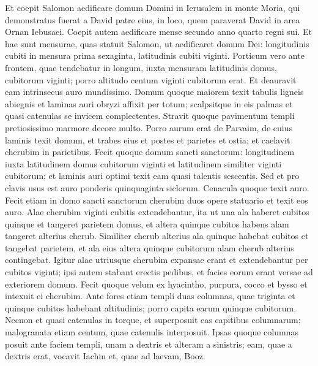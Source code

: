\begin{biblechapter}
\begin{biblechapter}
\begin{biblechapter}
\verse Et coepit Salomon aedificare domum Domini in Ierusalem in monte Moria, qui demonstratus fuerat a David patre eius, in loco, quem paraverat David in area Ornan Iebusaei. 
\verse Coepit autem aedificare mense secundo anno quarto regni sui.
 \verse Et hae sunt mensurae, quas statuit Salomon, ut aedificaret domum Dei: longitudinis cubiti in mensura prima sexaginta, latitudinis cubiti viginti. 
 \verse Porticum vero ante frontem, quae tendebatur in longum, iuxta mensuram latitudinis domus, cubitorum viginti; porro altitudo centum viginti cubitorum erat. Et deauravit eam intrinsecus auro mundissimo. 
\verse Domum quoque maiorem texit tabulis ligneis abiegnis et laminas auri obryzi affixit per totum; scalpsitque in eis palmas et quasi catenulas se invicem complectentes. 
\verse Stravit quoque pavimentum templi pretiosissimo marmore decore multo. 
\verse Porro aurum erat de Parvaim, de cuius laminis texit domum, et trabes eius et postes et parietes et ostia; et caelavit cherubim in parietibus.
 \verse Fecit quoque domum sancti sanctorum: longitudinem iuxta latitudinem domus cubitorum viginti et latitudinem similiter viginti cubitorum; et laminis auri optimi texit eam quasi talentis sescentis. 
\verse Sed et pro clavis usus est auro ponderis quinquaginta siclorum. Cenacula quoque texit auro.
 \verse Fecit etiam in domo sancti sanctorum cherubim duos opere statuario et texit eos auro. 
\verse Alae cherubim viginti cubitis extendebantur, ita ut una ala haberet cubitos quinque et tangeret parietem domus, et altera quinque cubitos habens alam tangeret alterius cherub. 
\verse Similiter cherub alterius ala quinque habebat cubitos et tangebat parietem, et ala eius altera quinque cubitorum alam cherub alterius contingebat. 
\verse Igitur alae utriusque cherubim expansae erant et extendebantur per cubitos viginti; ipsi autem stabant erectis pedibus, et facies eorum erant versae ad exteriorem domum.
 \verse Fecit quoque velum ex hyacintho, purpura, cocco et bysso et intexuit ei cherubim.
 \verse Ante fores etiam templi duas columnas, quae triginta et quinque cubitos habebant altitudinis; porro capita earum quinque cubitorum. 
\verse Necnon et quasi catenulas in torque, et superposuit eas capitibus columnarum; malogranata etiam centum, quae catenulis interposuit. 
\verse Ipsas quoque columnas posuit ante faciem templi, unam a dextris et alteram a sinistris; eam, quae a dextris erat, vocavit Iachin et, quae ad laevam, Booz.
 

\end{biblechapter}
\end{biblechapter}
\end{biblechapter}
